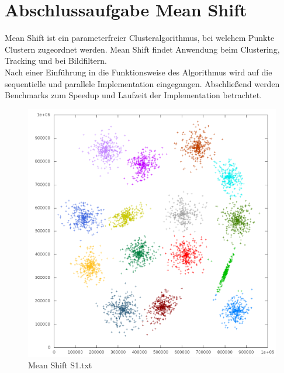 \chapter{Abschlussaufgabe Mean Shift}
Mean Shift ist ein parameterfreier Clusteralgorithmus, bei welchem Punkte Clustern zugeordnet werden. Mean Shift findet Anwendung beim Clustering,
Tracking und bei Bildfiltern.\\
Nach einer Einführung in die Funktionsweise des Algorithmus wird auf die sequentielle und parallele Implementation eingegangen.
Abschließend werden Benchmarks zum Speedup und Laufzeit der Implementation betrachtet.\\
\vspace{-10pt}
\begin{figure}[H]
	\centering
	\includegraphics[scale=0.61]{../meanshift/output/pics/s1_colored.png} 
	\vspace{-10pt}
	\caption{Mean Shift S1.txt}
\end{figure}
